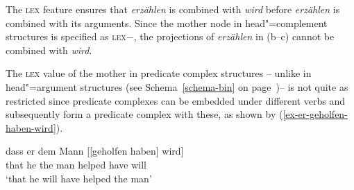 {{The \textsc{lex} feature ensures that \emph{erzählen} is combined with \emph{wird} before
\emph{erzählen} is combined with its arguments. Since the mother node in head"=complement
structures is specified as \textsc{lex}$-$, the projections of \emph{erzählen} in (b--c)
cannot be combined with \emph{wird}.




The \textsc{lex} value of the mother in predicate complex structures  -- unlike in head"=argument structures
(see Schema~\ref{schema-bin} on page~\pageref{schema-bin})-- is not quite as restricted since predicate complexes can be
embedded under different verbs and subsequently form a predicate complex with these, as shown by (\ref{ex-er-geholfen-haben-wird}).

\ea
\label{ex-er-geholfen-haben-wird}
\gll dass er dem Mann [[geholfen haben] wird]\\
     that he the man \hspaceThis{[[}helped have will\\
\glt `that he will have helped the man'
\z

}}
